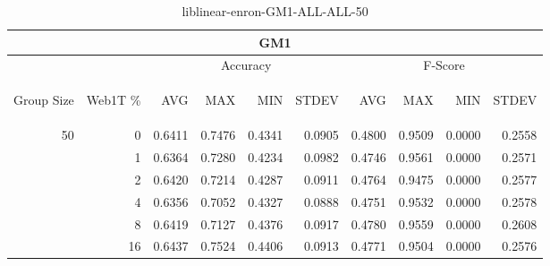 \begin{center}
\begin{table}[htbp]
\begin{tabular}{ | r | r | r | r | r | r | r | r | r | r |}
\hline
\multicolumn{10}{|c|}{GM1}\\
\hline
 & & \multicolumn{4}{|c|}{Accuracy} & \multicolumn{4}{|c|}{F-Score}\\ \cline{3-10}
\begin{sideways}Group Size\end{sideways} & \begin{sideways}Web1T \%\end{sideways} & \begin{sideways}AVG\end{sideways} & \begin{sideways}MAX\end{sideways} & \begin{sideways}MIN\end{sideways} & \begin{sideways}STDEV\end{sideways} & \begin{sideways}AVG\end{sideways} & \begin{sideways}MAX\end{sideways} & \begin{sideways}MIN\end{sideways} & \begin{sideways}STDEV\end{sideways}\\
\hline
\multirow{6}{*}{50}
 & 0 & 0.6411 & 0.7476 & 0.4341 & 0.0905 & 0.4800 & 0.9509 & 0.0000 & 0.2558\\ \cline{2-10}
 & 1 & 0.6364 & 0.7280 & 0.4234 & 0.0982 & 0.4746 & 0.9561 & 0.0000 & 0.2571\\ \cline{2-10}
 & 2 & 0.6420 & 0.7214 & 0.4287 & 0.0911 & 0.4764 & 0.9475 & 0.0000 & 0.2577\\ \cline{2-10}
 & 4 & 0.6356 & 0.7052 & 0.4327 & 0.0888 & 0.4751 & 0.9532 & 0.0000 & 0.2578\\ \cline{2-10}
 & 8 & 0.6419 & 0.7127 & 0.4376 & 0.0917 & 0.4780 & 0.9559 & 0.0000 & 0.2608\\ \cline{2-10}
 & 16 & 0.6437 & 0.7524 & 0.4406 & 0.0913 & 0.4771 & 0.9504 & 0.0000 & 0.2576\\ \cline{2-10}
\hline
\end{tabular}
\caption{liblinear-enron-GM1-ALL-ALL-50}
\end{table}
\end{center}

